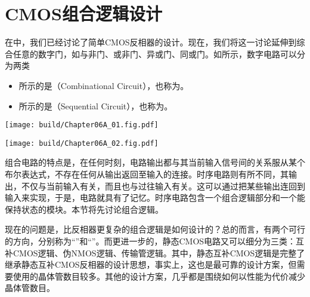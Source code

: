 \chapter{CMOS组合逻辑设计}
在中，我们已经讨论了简单CMOS反相器的设计。现在，我们将这一讨论延伸到综合任意的数字门，如与非门、或非门、异或门、同或门。如所示，数字电路可以分为两类
\begin{itemize}
    \item {}所示的是（Combinational Circuit），也称为。
    \item {}所示的是（Sequential Circuit），也称为。
\end{itemize}

\begin{Figure}[数字电路的高层次分类]
    \begin{FigureSub}[组合电路]
        \texttt{[image: build/Chapter06A\_01.fig.pdf]}
    \end{FigureSub}
    \hspace{1cm}
    \begin{FigureSub}[时序电路]
        \texttt{[image: build/Chapter06A\_02.fig.pdf]}
    \end{FigureSub}
\end{Figure}
组合电路的特点是，在任何时刻，电路输出都与其当前输入信号间的关系服从某个布尔表达式，不存在任何从输出返回至输入的连接。时序电路则有所不同，其输出，不仅与当前输入有关，而且也与过往输入有关。这可以通过把某些输出连回到输入来实现，于是，电路就具有了记忆。时序电路包含一个组合逻辑部分和一个能保持状态的模块。本节将先讨论组合逻辑。

现在的问题是，比反相器更复杂的组合逻辑是如何设计的？总的而言，有两个可行的方向，分别称为“”和“”。而更进一步的，静态CMOS电路又可以细分为三类：互补CMOS逻辑、伪NMOS逻辑、传输管逻辑。其中，静态互补CMOS逻辑是完整了继承静态互补CMOS反相器的设计思想，事实上，这也是最可靠的设计方案，但需要使用的晶体管数目较多。其他的设计方案，几乎都是围绕如何以性能为代价减少晶体管数目。




